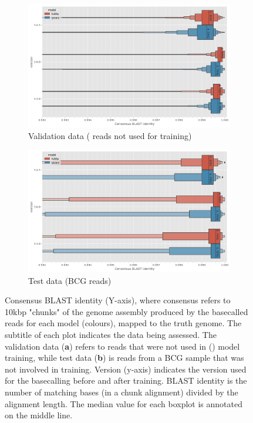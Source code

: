 \begin{figure}
     \centering
     \begin{subfigure}[b]{0.9\textwidth}
        \includegraphics[width=1\linewidth]{Chapter4/Figs/eval_consensus_blast_identity.png}
        \centering
        \caption{Validation data (\mtb{} reads not used for training)}
        \label{fig:eval-consensus-blast}
     \end{subfigure}
     \hfill
     \begin{subfigure}[b]{0.9\textwidth}
         \centering
        \includegraphics[width=1\linewidth]{Chapter4/Figs/test_consensus_blast_identity.png}
         \caption{Test data (BCG reads)}
         \label{fig:test-consensus-blast}
     \end{subfigure}
        \caption{Consensus BLAST identity (Y-axis), where consensus refers to 10kbp "chunks" of the genome assembly produced by the basecalled reads for each model (colours), mapped to the truth genome. The subtitle of each plot indicates the data being assessed. The validation data (\textbf{a}) refers to \mtb{} reads that were not used in (\tubby{}) model training, while test data (\textbf{b}) is reads from a BCG sample that was not involved in training. Version (y-axis) indicates the \guppy{} version used for the basecalling before and after training. BLAST identity is the number of matching bases (in a chunk alignment) divided by the alignment length. The median value for each boxplot is annotated on the middle line.}
        \label{fig:consensus-blast}
\end{figure}

